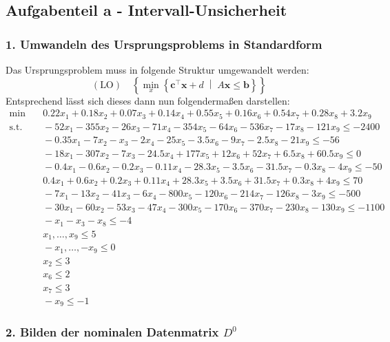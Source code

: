 \documentclass[a4paper,12pt]{article}
\begin{document}
\subsection*{Aufgabenteil a - Intervall-Unsicherheit}

\subsubsection*{1. Umwandeln des Ursprungsproblems in Standardform}

Das Ursprungsproblem muss in folgende Struktur umgewandelt werden:
\[
(\text{LO}) \quad \left\{ \min_{x} \left\{ \mathbf{c}^\top \mathbf{x} + d \; \middle| \; A\mathbf{x} \leq \mathbf{b} \right\} \right\}
\]
Entsprechend l\"asst sich dieses dann nun folgenderma\ss en darstellen:
\[
\begin{aligned}
    \min & \quad 0.22x_1 + 0.18x_2 + 0.07x_3 + 0.14x_4 + 0.55x_5 + 0.16x_6 + 0.54x_7 + 0.28x_8 + 3.2x_9 \\
    \text{s.t.} & \quad -52x_1 - 355x_2 - 26x_3 - 71x_4 - 354x_5 - 64x_6 - 536x_7 - 17x_8 - 121x_9 \leq -2400 \\
    & \quad -0.35x_1 - 7x_2 - x_3 - 2x_4 - 25x_5 - 3.5x_6 - 9x_7 - 2.5x_8 - 21x_9 \leq -56 \\
    & \quad -18x_1 - 307x_2 - 7x_3 - 24.5x_4 + 177x_5 + 12x_6 + 52x_7 + 6.5x_8 + 60.5x_9 \leq 0 \\
    & \quad -0.4x_1 - 0.6x_2 - 0.2x_3 - 0.11x_4 - 28.3x_5 - 3.5x_6 - 31.5x_7 - 0.3x_8 - 4x_9 \leq -50 \\
    & \quad 0.4x_1 + 0.6x_2 + 0.2x_3 + 0.11x_4 + 28.3x_5 + 3.5x_6 + 31.5x_7 + 0.3x_8 + 4x_9 \leq 70 & \\
    & \quad -7x_1 - 13x_2 - 41x_3 - 6x_4 - 800x_5 - 120x_6 - 214x_7 - 126x_8 - 3x_9 \leq -500 \\
    & \quad -30x_1 - 60x_2 - 53x_3 - 47x_4 - 300x_5 - 170x_6 - 370x_7 - 230x_8 - 130x_9 \leq -1100 \\
    & \quad -x_1 - x_3 - x_8 \leq -4 \\
    & \quad x_1, \dots, x_9 \leq 5 \\
    & \quad - x_1, \dots, - x_9 \leq 0 \\
    & \quad x_2 \leq 3 \\
    & \quad x_6 \leq 2 \\
    & \quad x_7 \leq 3 \\
    & \quad - x_9 \leq - 1
\end{aligned}
\]

\subsubsection*{2. Bilden der nominalen Datenmatrix $D^0$}
\end{document}

